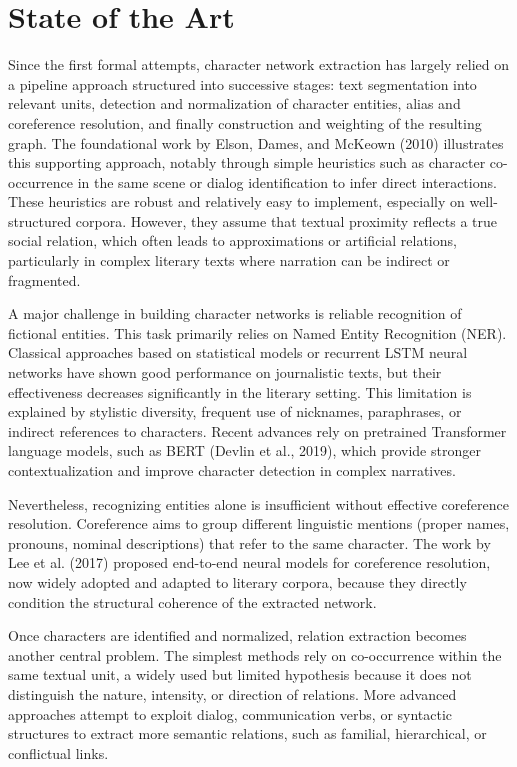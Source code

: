\documentclass[a4paper]{article}
\begin{document}
\section{State of the Art}

Since the first formal attempts, character network extraction has largely relied on a pipeline approach structured into successive stages: text segmentation into relevant units, detection and normalization of character entities, alias and coreference resolution, and finally construction and weighting of the resulting graph. The foundational work by Elson, Dames, and McKeown (2010) illustrates this supporting approach, notably through simple heuristics such as character co-occurrence in the same scene or dialog identification to infer direct interactions. These heuristics are robust and relatively easy to implement, especially on well-structured corpora. However, they assume that textual proximity reflects a true social relation, which often leads to approximations or artificial relations, particularly in complex literary texts where narration can be indirect or fragmented.

A major challenge in building character networks is reliable recognition of fictional entities. This task primarily relies on Named Entity Recognition (NER). Classical approaches based on statistical models or recurrent LSTM neural networks have shown good performance on journalistic texts, but their effectiveness decreases significantly in the literary setting. This limitation is explained by stylistic diversity, frequent use of nicknames, paraphrases, or indirect references to characters. Recent advances rely on pretrained Transformer language models, such as BERT (Devlin et al., 2019), which provide stronger contextualization and improve character detection in complex narratives.

Nevertheless, recognizing entities alone is insufficient without effective coreference resolution. Coreference aims to group different linguistic mentions (proper names, pronouns, nominal descriptions) that refer to the same character. The work by Lee et al. (2017) proposed end-to-end neural models for coreference resolution, now widely adopted and adapted to literary corpora, because they directly condition the structural coherence of the extracted network.

Once characters are identified and normalized, relation extraction becomes another central problem. The simplest methods rely on co-occurrence within the same textual unit, a widely used but limited hypothesis because it does not distinguish the nature, intensity, or direction of relations. More advanced approaches attempt to exploit dialog, communication verbs, or syntactic structures to extract more semantic relations, such as familial, hierarchical, or conflictual links.
\end{document}
